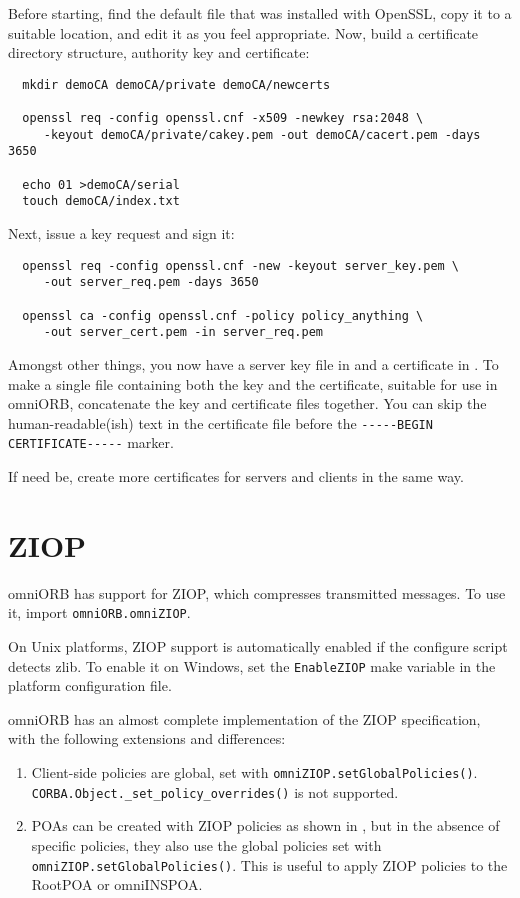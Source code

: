 \documentclass[11pt,oneside,a4paper]{book}
\newcommand{\code}[1]{\texttt{#1}}
\newcommand{\op}[1]{\texttt{#1()}}
\begin{document}
Before starting, find the default  file that was
installed with OpenSSL, copy it to a suitable location, and edit it as
you feel appropriate. Now, build a certificate directory structure,
authority key and certificate:

\begin{verbatim}
  mkdir demoCA demoCA/private demoCA/newcerts

  openssl req -config openssl.cnf -x509 -newkey rsa:2048 \
     -keyout demoCA/private/cakey.pem -out demoCA/cacert.pem -days 3650

  echo 01 >demoCA/serial
  touch demoCA/index.txt
\end{verbatim}

\noindent Next, issue a key request and sign it:

\begin{verbatim}
  openssl req -config openssl.cnf -new -keyout server_key.pem \
     -out server_req.pem -days 3650

  openssl ca -config openssl.cnf -policy policy_anything \
     -out server_cert.pem -in server_req.pem 
\end{verbatim}

\noindent Amongst other things, you now have a server key file in
 and a certificate in . To
make a single file containing both the key and the certificate,
suitable for use in omniORB, concatenate the key and certificate files
together.  You can skip the human-readable(ish) text in the
certificate file before the \verb|-----BEGIN CERTIFICATE-----| marker.

If need be, create more certificates for servers and clients in the
same way.


\section{ZIOP}

omniORB has support for ZIOP, which compresses transmitted
messages. To use it, import \code{omniORB.omniZIOP}.

On Unix platforms, ZIOP support is automatically enabled if the
configure script detects zlib. To enable it on Windows, set the
\code{EnableZIOP} make variable in the platform configuration file.

omniORB has an almost complete implementation of the ZIOP
specification, with the following extensions and differences:

\begin{enumerate}
\item Client-side policies are global, set with
  \op{omniZIOP.setGlobalPolicies}.
  \op{CORBA.Object.\_set\_policy\_overrides} is not supported.

\item POAs can be created with ZIOP policies as shown in
  \file{examples/ziop/ziop_srv.py}, but in the absence of specific
  policies, they also use the global policies set with
  \op{omniZIOP.setGlobalPolicies}.  This is useful to apply ZIOP
  policies to the RootPOA or omniINSPOA.
\end{enumerate}
\end{document}

